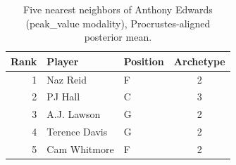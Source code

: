 \begin{table}[htbp]
  \centering\small
  \begin{tabular}{rllc}
    \toprule
    Rank & Player & Position & Archetype \\
    \midrule
    1 & Naz Reid & F & 2 \\
    2 & PJ Hall & C & 3 \\
    3 & A.J. Lawson & G & 2 \\
    4 & Terence Davis & G & 2 \\
    5 & Cam Whitmore & F & 2 \\
    \bottomrule
  \end{tabular}
  \caption{Five nearest neighbors of Anthony Edwards (peak_value modality), Procrustes-aligned posterior mean.}
  \label{tab:Anthony_Edwards_neighbors_peak_value}
\end{table}

